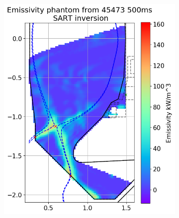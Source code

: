 \begin{figure}[!ht]
     \begin{subfigure}{0.49\linewidth}
         \centering
         \includegraphics[trim={10 5 0 43},clip,width=\textwidth]{Chapters/chapter2/figs/inversion_comparison_emissivity_pantom_test-SART.png}
         \caption{}
         \label{fig:self_phantom1a}
     \end{subfigure}
     \hfill
     \begin{subfigure}{0.49\linewidth}
         \centering

\end{subfigure}
\end{figure}
